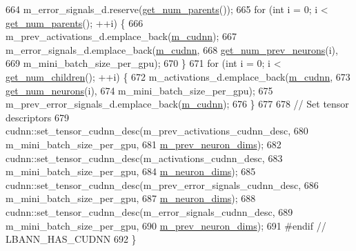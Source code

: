 \begin{DoxyCode}
664   m\_error\_signals\_d.reserve(\hyperlink{classlbann_1_1Layer_ac9290d4a6453ccda5f6b4d8b57b49ba3}{get\_num\_parents}());
665   \textcolor{keywordflow}{for} (\textcolor{keywordtype}{int} i = 0; i < \hyperlink{classlbann_1_1Layer_ac9290d4a6453ccda5f6b4d8b57b49ba3}{get\_num\_parents}(); ++i) \{
666     m\_prev\_activations\_d.emplace\_back(\hyperlink{classlbann_1_1Layer_a08dbb94239e3b8c96329786c57c72e21}{m\_cudnn});
667     m\_error\_signals\_d.emplace\_back(\hyperlink{classlbann_1_1Layer_a08dbb94239e3b8c96329786c57c72e21}{m\_cudnn},
668                                    \hyperlink{classlbann_1_1Layer_a27112eb70bbfbd7f3c3e749960400dec}{get\_num\_prev\_neurons}(i),
669                                    m\_mini\_batch\_size\_per\_gpu);
670   \}
671   \textcolor{keywordflow}{for} (\textcolor{keywordtype}{int} i = 0; i < \hyperlink{classlbann_1_1Layer_a1409a117c31a7ea4f2c7a4d22a3e86c3}{get\_num\_children}(); ++i) \{
672     m\_activations\_d.emplace\_back(\hyperlink{classlbann_1_1Layer_a08dbb94239e3b8c96329786c57c72e21}{m\_cudnn},
673                                  \hyperlink{classlbann_1_1Layer_aa4de686cc6c2dd38166f42faf874f227}{get\_num\_neurons}(i),
674                                  m\_mini\_batch\_size\_per\_gpu);
675     m\_prev\_error\_signals\_d.emplace\_back(\hyperlink{classlbann_1_1Layer_a08dbb94239e3b8c96329786c57c72e21}{m\_cudnn});
676   \}
677 
678   \textcolor{comment}{// Set tensor descriptors}
679   cudnn::set\_tensor\_cudnn\_desc(m\_prev\_activations\_cudnn\_desc,
680                                m\_mini\_batch\_size\_per\_gpu,
681                                \hyperlink{classlbann_1_1Layer_ae204d1a2a79606eaa117273857ff62a3}{m\_prev\_neuron\_dims});
682   cudnn::set\_tensor\_cudnn\_desc(m\_activations\_cudnn\_desc,
683                                m\_mini\_batch\_size\_per\_gpu,
684                                \hyperlink{classlbann_1_1Layer_abb34bb8031f57a483e2e327a5f229f48}{m\_neuron\_dims});
685   cudnn::set\_tensor\_cudnn\_desc(m\_prev\_error\_signals\_cudnn\_desc,
686                                m\_mini\_batch\_size\_per\_gpu,
687                                \hyperlink{classlbann_1_1Layer_abb34bb8031f57a483e2e327a5f229f48}{m\_neuron\_dims});
688   cudnn::set\_tensor\_cudnn\_desc(m\_error\_signals\_cudnn\_desc,
689                                m\_mini\_batch\_size\_per\_gpu,
690                                \hyperlink{classlbann_1_1Layer_ae204d1a2a79606eaa117273857ff62a3}{m\_prev\_neuron\_dims});
691 \textcolor{preprocessor}{#endif // LBANN\_HAS\_CUDNN}
692 \}
\end{DoxyCode}
